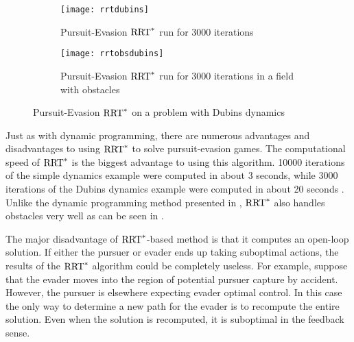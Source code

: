 \begin{figure}
\centering
\begin{subfigure}[b]{0.475\textwidth}
	\centering
	\texttt{[image: rrtdubins]}
	\caption{Pursuit-Evasion $\textnormal{RRT}^*$ run for 3000 iterations}
	\label{rrtdubins}
\end{subfigure}
\hfill
\begin{subfigure}[b]{0.475\textwidth}
	\centering
	\texttt{[image: rrtobsdubins]}
	\caption{Pursuit-Evasion $\textnormal{RRT}^*$ run for 3000 iterations in a field with obstacles}
	\label{rrtobsdubins}
\end{subfigure}
\caption{Pursuit-Evasion $\textnormal{RRT}^*$ on a problem with Dubins dynamics \cite{karaman}}
\label{rrtdubinsfig}
\end{figure}

Just as with dynamic programming, there are numerous advantages and disadvantages to using $\textnormal{RRT}^*$ to solve pursuit-evasion games. The computational speed of $\textnormal{RRT}^*$ is the biggest advantage to using this algorithm. 10000 iterations of the simple dynamics example were computed in about 3 seconds, while 3000 iterations of the Dubins dynamics example were computed in about 20 seconds \cite{karaman}. Unlike the dynamic programming method presented in , $\textnormal{RRT}^*$ also handles obstacles very well as can be seen in . 

The major disadvantage of $\textnormal{RRT}^*$-based method is that it computes an open-loop solution. If either the pursuer or evader ends up taking suboptimal actions, the results of the $\textnormal{RRT}^*$ algorithm could be completely useless. For example, suppose that the evader moves into the region of potential pursuer capture by accident. However, the pursuer is elsewhere expecting evader optimal control. In this case the only way to determine a new path for the evader is to recompute the entire solution. Even when the solution is recomputed, it is suboptimal in the feedback sense.             